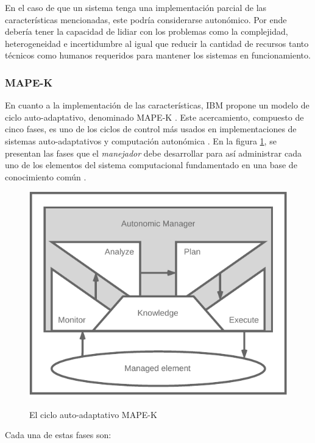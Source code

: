 En el caso de que un sistema tenga una implementación parcial de las características mencionadas, este podría considerarse autonómico. Por ende debería tener la capacidad de lidiar con los problemas como la complejidad, heterogeneidad e incertidumbre \cite{emerging_2005} al igual que reducir la cantidad de recursos tanto técnicos como humanos requeridos para mantener los sistemas en funcionamiento.

\subsubsection{MAPE-K}


En cuanto a la implementación de las características, IBM propone un modelo de ciclo auto-adaptativo, denominado MAPE-K \cite{Krikava2013}. Este acercamiento, compuesto de cinco fases, es uno de los ciclos de control más usados en implementaciones de sistemas auto-adaptativos y computación autonómica \cite{Arcaini_2015}. En la figura \ref{fig:mapek}, se presentan las fases que el \textit{manejador} debe desarrollar para así administrar cada uno de los elementos del sistema computacional fundamentado en una base de conocimiento común \cite{alessandra_2010}. 

\begin{figure}[ht]
    \centering
    \caption{El ciclo auto-adaptativo MAPE-K \protect\cite{alessandra_2010}} 
    \includegraphics[width=0.6\linewidth]{images/mape-k.pdf}
    \label{fig:mapek}
\end{figure}

Cada una de estas fases son:

